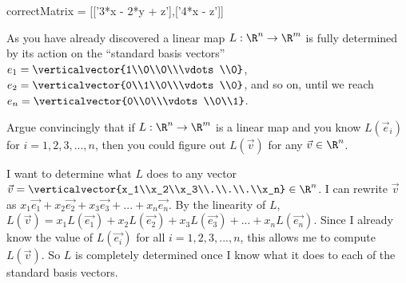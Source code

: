 \documentclass{ximera}
\begin{document}
\begin{question}
\begin{solution}
    \begin{matrix-answer}[name=v]
      correctMatrix = [['3*x - 2*y + z'],['4*x - z']]
    \end{matrix-answer}
    
  \end{solution}

  As you have already discovered a linear map $L: \R^n \to \R^m$ is
  fully determined by its action on the ``standard basis vectors''
  $e_1 = \verticalvector{1\\0\\0\\\vdots\\0}$, $e_2 =
  \verticalvector{0\\1\\0\\\vdots\\0}$, and so on, until we reach $e_n
  = \verticalvector{0\\0\\\vdots\\0\\1}$.

  Argue convincingly that if $L:\R^n \to\R^m$ is a linear map and you know $L(\vec{e}_i)$ for $i=1,2,3,...,n$, then you could figure out $L(\vec{v})$ for
  any $\vec{v} \in \R^n$.
  \begin{free-response}
    I want to determine what $L$ does to any vector $\vec{v} = \verticalvector{x_1\\x_2\\x_3\\.\\.\\.\\x_n} \in \R^n$.  
    I can rewrite $\vec{v}$ as $x_1\vec{e_1}+x_2\vec{e_2}+x_3\vec{e_3}+...+x_n\vec{e_n}$.  By the linearity of $L$,
    $L(\vec{v}) = x_1L(\vec{e_1})+x_2L(\vec{e_2})+x_3L(\vec{e_3})+...+x_nL(\vec{e_n})$.  Since I already know the value of 
    $L(\vec{e_i})$ for all $i=1,2,3,...,n$, this allows me to compute $L(\vec{v})$.  So $L$ is completely determined once I know what it does to each of the
    standard basis vectors. 
  \end{free-response}
\end{question}

\end{document}
